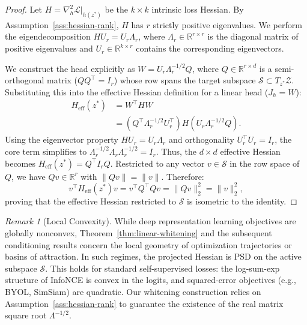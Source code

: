 \documentclass{article}
\theoremstyle{plain}
\theoremstyle{definition}
\theoremstyle{remark}
\newtheorem{remark}[theorem]{Remark}
\begin{document}
\begin{proof}
Let $H = \nabla^2_h \mathcal{L} |_{h(z^*)}$ be the $k \times k$ intrinsic loss Hessian. By Assumption~\ref{ass:hessian-rank}, $H$ has $r$ strictly positive eigenvalues. We perform the eigendecomposition $H U_r = U_r \Lambda_r$, where $\Lambda_r \in \mathbb{R}^{r \times r}$ is the diagonal matrix of positive eigenvalues and $U_r \in \mathbb{R}^{k \times r}$ contains the corresponding eigenvectors.

We construct the head explicitly as $W = U_r \Lambda_r^{-1/2} Q$, where $Q \in \mathbb{R}^{r \times d}$ is a semi-orthogonal matrix ($Q Q^\top = I_r$) whose row spans the target subspace $\mathcal{S} \subset T_{z^*} \mathcal{Z}$. Substituting this into the effective Hessian definition for a linear head ($J_h = W$):
\begin{align*}
    H_{\text{eff}}(z^*) &= W^\top H W \\
    &= (Q^\top \Lambda_r^{-1/2} U_r^\top) H (U_r \Lambda_r^{-1/2} Q).
\end{align*}
Using the eigenvector property $H U_r = U_r \Lambda_r$ and orthogonality $U_r^\top U_r = I_r$, the core term simplifies to $\Lambda_r^{-1/2} \Lambda_r \Lambda_r^{-1/2} = I_r$. Thus, the $d \times d$ effective Hessian becomes $H_{\text{eff}}(z^*) = Q^\top I_r Q$. Restricted to any vector $v \in \mathcal{S}$ in the row space of $Q$, we have $Qv \in \mathbb{R}^r$ with $\|Qv\| = \|v\|$. Therefore:
\begin{equation*}
    v^\top H_{\text{eff}}(z^*) v = v^\top Q^\top Q v = \|Qv\|^2_2 = \|v\|^2_2,
\end{equation*}
proving that the effective Hessian restricted to $\mathcal{S}$ is isometric to the identity.
\end{proof}

\begin{remark}[Local Convexity]
While deep representation learning objectives are globally nonconvex, Theorem~\ref{thm:linear-whitening} and the subsequent conditioning results concern the local geometry of optimization trajectories or basins of attraction. In such regimes, the projected Hessian is PSD on the active subspace $\mathcal S$. This holds for standard self-supervised losses: the log-sum-exp structure of InfoNCE is convex in the logits, and squared-error objectives (e.g., BYOL, SimSiam) are quadratic. Our whitening construction relies on Assumption~\ref{ass:hessian-rank} to guarantee the existence of the real matrix square root $\Lambda^{-1/2}$.
\end{remark}
\end{document}
